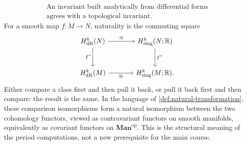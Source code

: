 \[
\boxed{\begin{gathered}
\text{An invariant built analytically from differential forms}\\
\text{agrees with a topological invariant.}
\end{gathered}}
\]
For a smooth map $f:M\to N$, naturality is the commuting square
\[
\begin{tikzcd}[column sep=large,row sep=large]
H_{\mathrm{dR}}^k(N)\arrow[r,"\cong"]\arrow[d,"f^*"'] &
H_{\mathrm{sing}}^k(N;\R)\arrow[d,"f^*"]\\
H_{\mathrm{dR}}^k(M)\arrow[r,"\cong"'] & H_{\mathrm{sing}}^k(M;\R).
\end{tikzcd}
\]
Either compare a class first and then pull it back, or pull it back first
and then compare: the result is the same.
In the language of \cref{def:natural-transformation}, these comparison
isomorphisms form a natural isomorphism between the two cohomology functors,
viewed as contravariant functors on smooth manifolds, equivalently as
covariant functors on \(\mathbf{Man}^{\mathrm{op}}\). This is the structural meaning
of the period computations, not a new prerequisite for the main course.

